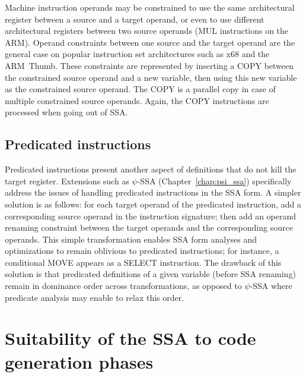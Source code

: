 Machine instruction operands may be constrained to use the same
architectural register between a source and a target operand, or even to use
different architectural registers between two source operands (MUL
instructions on the ARM). Operand constraints between one source and the
target operand are the general case on popular instruction set architectures such as
x68 and the ARM~Thumb. These constraints are represented by inserting a COPY
between the constrained source operand and a new variable, then using this new
variable as the constrained source operand. The COPY is a parallel copy in case of
multiple constrained source operands. Again, the COPY instructions are processed when
going out of SSA.

\subsection{Predicated instructions}

Predicated instructions present another aspect of definitions that do not
kill the target register. Extensions such as $\psi$-SSA
(Chapter~\ref{chap:psi_ssa}) specifically address the issues of handling
predicated instructions in the SSA form. A simpler solution is as follows: for
each target operand of the predicated instruction, add a corresponding source
operand in the instruction signature; then add an operand renaming constraint
between the target operands and the corresponding source operands. This simple
transformation enables SSA form analyses and optimizations to remain oblivious
to predicated instructions; for instance, a conditional MOVE appears as a SELECT
instruction. The drawback of this solution is that predicated definitions of a
given variable (before SSA renaming) remain in dominance order across
transformations, as opposed to $\psi$-SSA where predicate analysis may enable to
relax this order.


\section{Suitability of the SSA to code generation phases}
\label{sec:ssa-codegen-suitability}


